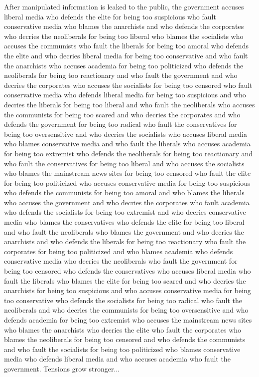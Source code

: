 \documentclass{report}
\begin{document}
After manipulated information is leaked to the public, the government accuses liberal media who defends the elite for being too suspicious who fault conservative media who blames the anarchists and who defends the corporates who decries the neoliberals for being too liberal who blames the socialists who accuses the communists who fault the liberals for being too amoral who defends the elite and who decries liberal media for being too conservative and who fault the anarchists who accuses academia for being too politicized who defends the neoliberals for being too reactionary and who fault the government and who decries the corporates who accuses the socialists for being too censored who fault conservative media who defends liberal media for being too suspicious and who decries the liberals for being too liberal and who fault the neoliberals who accuses the communists for being too scared and who decries the corporates and who defends the government for being too radical who fault the conservatives for being too oversensitive and who decries the socialists who accuses liberal media who blames conservative media and who fault the liberals who accuses academia for being too extremist who defends the neoliberals for being too reactionary and who fault the conservatives for being too liberal and who accuses the socialists who blames the mainstream news sites for being too censored who fault the elite for being too politicized who accuses conservative media for being too suspicious who defends the communists for being too amoral and who blames the liberals who accuses the government and who decries the corporates who fault academia who defends the socialists for being too extremist and who decries conservative media who blames the conservatives who defends the elite for being too liberal and who fault the neoliberals who blames the government and who decries the anarchists and who defends the liberals for being too reactionary who fault the corporates for being too politicized and who blames academia who defends conservative media who decries the neoliberals who fault the government for being too censored who defends the conservatives who accuses liberal media who fault the liberals who blames the elite for being too scared and who decries the anarchists for being too suspicious and who accuses conservative media for being too conservative who defends the socialists for being too radical who fault the neoliberals and who decries the communists for being too oversensitive and who defends academia for being too extremist who accuses the mainstream news sites who blames the anarchists who decries the elite who fault the corporates who blames the neoliberals for being too censored and who defends the communists and who fault the socialists for being too politicized who blames conservative media who defends liberal media and who accuses academia who fault the government. Tensions grow stronger...
\end{document}
